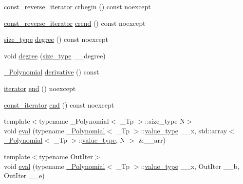 \begin{DoxyCompactItemize}
\item 
\hyperlink{class____gnu__cxx_1_1__Polynomial_a2a042a80127ab9a7b0349a54791e59af}{const\+\_\+reverse\+\_\+iterator} \hyperlink{class____gnu__cxx_1_1__Polynomial_a263b74157472085ae2fb01957a5bda5e}{crbegin} () const noexcept
\item 
\hyperlink{class____gnu__cxx_1_1__Polynomial_a2a042a80127ab9a7b0349a54791e59af}{const\+\_\+reverse\+\_\+iterator} \hyperlink{class____gnu__cxx_1_1__Polynomial_a0b314ced62a607798572646a76f2ac35}{crend} () const noexcept
\item 
\hyperlink{class____gnu__cxx_1_1__Polynomial_a6afe219c123c7a2fdc5abac8a6639053}{size\+\_\+type} \hyperlink{class____gnu__cxx_1_1__Polynomial_a07d9933aeeb9afbd823218ed921336cb}{degree} () const noexcept
\item 
void \hyperlink{class____gnu__cxx_1_1__Polynomial_af6ae7990b6185dc3597a8a5d6abdd13a}{degree} (\hyperlink{class____gnu__cxx_1_1__Polynomial_a6afe219c123c7a2fdc5abac8a6639053}{size\+\_\+type} \+\_\+\+\_\+degree)
\item 
\hyperlink{class____gnu__cxx_1_1__Polynomial}{\+\_\+\+Polynomial} \hyperlink{class____gnu__cxx_1_1__Polynomial_a69e973ccaf5857251a8b7971e19a5ec7}{derivative} () const
\item 
\hyperlink{class____gnu__cxx_1_1__Polynomial_a64bd557b6af46992e352dbe9e30fa201}{iterator} \hyperlink{class____gnu__cxx_1_1__Polynomial_a7997059cf934fc454497be9074ebc958}{end} () noexcept
\item 
\hyperlink{class____gnu__cxx_1_1__Polynomial_a96e4523cc2a834724fe4224f0800486b}{const\+\_\+iterator} \hyperlink{class____gnu__cxx_1_1__Polynomial_a3f971eb02150e9ca66e8222ba4a5aa3d}{end} () const noexcept
\item 
{\footnotesize template$<$typename \+\_\+\+Polynomial$<$ \+\_\+\+Tp $>$\+::size\+\_\+type N$>$ }\\void \hyperlink{class____gnu__cxx_1_1__Polynomial_a5558b16a9a4b594e506d30e5d10289b4}{eval} (typename \hyperlink{class____gnu__cxx_1_1__Polynomial}{\+\_\+\+Polynomial}$<$ \+\_\+\+Tp $>$\+::\hyperlink{class____gnu__cxx_1_1__Polynomial_a725563351f50e76084a7a016c06f8a53}{value\+\_\+type} \+\_\+\+\_\+x, std\+::array$<$ \hyperlink{class____gnu__cxx_1_1__Polynomial}{\+\_\+\+Polynomial}$<$ \+\_\+\+Tp $>$\+::\hyperlink{class____gnu__cxx_1_1__Polynomial_a725563351f50e76084a7a016c06f8a53}{value\+\_\+type}, N $>$ \&\+\_\+\+\_\+arr)
\item 
{\footnotesize template$<$typename Out\+Iter$>$ }\\void \hyperlink{class____gnu__cxx_1_1__Polynomial_a2251cb8f6518118c78494f4eb015ed8f}{eval} (typename \hyperlink{class____gnu__cxx_1_1__Polynomial}{\+\_\+\+Polynomial}$<$ \+\_\+\+Tp $>$\+::\hyperlink{class____gnu__cxx_1_1__Polynomial_a725563351f50e76084a7a016c06f8a53}{value\+\_\+type} \+\_\+\+\_\+x, Out\+Iter \+\_\+\+\_\+b, Out\+Iter \+\_\+\+\_\+e)

\end{DoxyCompactItemize}
